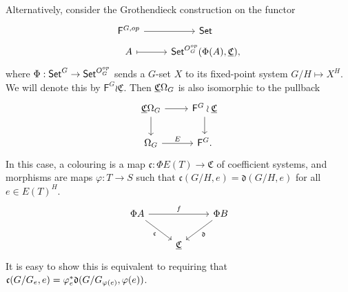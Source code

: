 \documentclass[a4paper,10pt
,draft
]{article}%
\renewcommand{\phi}{\varphi}
\begin{document}
\begin{remark}
      { \color{blue} %
        Alternatively,
        consider the Grothendieck construction on the functor
        \begin{equation}
              \begin{tikzcd}[row sep = tiny]
                    \mathsf F^{G,op} \arrow[r]
                    &
                    \mathsf{Set}
                    \\
                    A \arrow[r, mapsto]
                    &
                    \Set^{O_G^{op}}(\Phi(A), \underline{\mathfrak C}),
              \end{tikzcd}
        \end{equation}
        where $\Phi: \mathsf{Set}^G \to \mathsf{Set}^{O_G^{op}}$ sends a $G$-set $X$ to its fixed-point system $G/H \mapsto X^H$.
        We will denote this by $\mathsf F^G \wr \underline{\mathfrak C}$.
        Then $\underline{\mathfrak C} \Omega_G$ is also isomorphic to the pullback
        \begin{equation}
              \begin{tikzcd}
                    \CO \arrow[d] \arrow[r]
                    &
                    \mathsf F^G \wr \underline{\mathfrak C} \arrow[d]
                    \\
                    \Omega_G \arrow[r, "E"]
                    &
                    \mathsf F^G.
              \end{tikzcd}
        \end{equation}
        In this case, a colouring is a map $\mathfrak c: \Phi E(T) \to \mathfrak C$ of coefficient systems,
        and morphisms are maps $\phi: T \to S$ such that
        $\mathfrak c(G/H,e) = \mathfrak d(G/H,e)$ for all $e \in E(T)^H$.
        \begin{equation}
              \begin{tikzcd}
                    \Phi A \arrow[rr, "f"] \arrow[dr, "\mathfrak c"']
                    &&
                    \Phi B \arrow[dl, "\mathfrak d"]
                    \\
                    &
                    \underline{\mathfrak C}
              \end{tikzcd}
        \end{equation}
        It is easy to show this is equivalent to requiring that
        $\mathfrak c(G/G_e,e) = \phi_e^{\**} \mathfrak d(G/G_{\phi(e)}, \phi(e))$.
      }


\end{remark}
\end{document}
